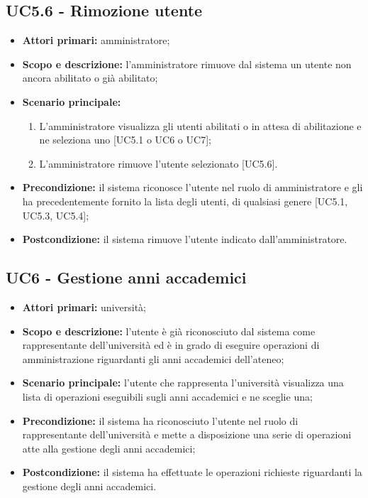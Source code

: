 \documentclass[AnalisiDeiRequisiti.tex]{subfiles}
\begin{document}
\subsection{UC5.6 - Rimozione utente}
\begin{itemize}
	\item \textbf{Attori primari:} amministratore;
	\item \textbf{Scopo e descrizione:} l'amministratore rimuove dal sistema un utente non ancora abilitato o già abilitato;
	\item \textbf{Scenario principale:}
	\begin{enumerate}
		\item L'amministratore visualizza gli utenti abilitati o in attesa di abilitazione e ne seleziona uno [UC5.1 o UC6 o UC7];
		\item L'amministratore rimuove l'utente selezionato [UC5.6].
	\end{enumerate}
	\item \textbf{Precondizione:} il sistema riconosce l'utente nel ruolo di amministratore e gli ha precedentemente fornito la lista degli utenti, di qualsiasi genere [UC5.1, UC5.3, UC5.4];
	\item \textbf{Postcondizione:} il sistema rimuove l'utente indicato dall'amministratore.
\end{itemize}

\subsection{UC6 - Gestione anni accademici}
\begin{itemize}
	\item \textbf{Attori primari:} università;
	\item \textbf{Scopo e descrizione:} l'utente è già riconosciuto dal sistema come rappresentante dell'università ed è in grado di eseguire operazioni di amministrazione riguardanti gli anni accademici dell'ateneo;
	\item \textbf{Scenario principale:} l'utente che rappresenta l'università visualizza una lista di operazioni eseguibili sugli anni accademici e ne sceglie una;
	\item \textbf{Precondizione:} il sistema ha riconosciuto l'utente nel ruolo di rappresentante dell'università e mette a disposizione una serie di operazioni atte alla gestione degli anni accademici; 
	\item \textbf{Postcondizione:} il sistema ha effettuate le operazioni richieste riguardanti la gestione degli anni accademici.
\end{itemize}
\end{document}
